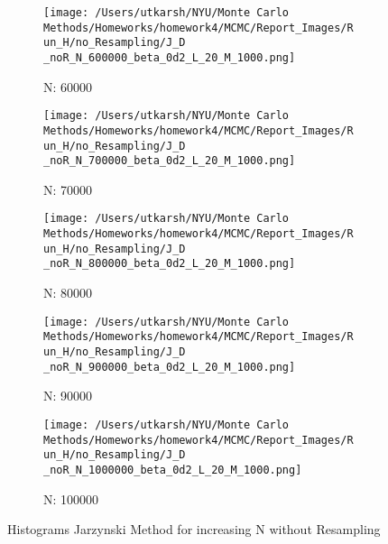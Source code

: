 \documentclass[11pt]{article}
\begin{document}
\begin{figure}[H]
	\begin{subfigure}{.18\textwidth}
		\texttt{[image: /Users/utkarsh/NYU/Monte Carlo Methods/Homeworks/homework4/MCMC/Report\_Images/Run\_H/no\_Resampling/J\_D \_noR\_N\_600000\_beta\_0d2\_L\_20\_M\_1000.png]}
		\caption{N: 60000}
	\end{subfigure}
	\begin{subfigure}{.18\textwidth}
		\texttt{[image: /Users/utkarsh/NYU/Monte Carlo Methods/Homeworks/homework4/MCMC/Report\_Images/Run\_H/no\_Resampling/J\_D \_noR\_N\_700000\_beta\_0d2\_L\_20\_M\_1000.png]}
		\caption{N: 70000}
	\end{subfigure}
	\begin{subfigure}{.18\textwidth}
		\texttt{[image: /Users/utkarsh/NYU/Monte Carlo Methods/Homeworks/homework4/MCMC/Report\_Images/Run\_H/no\_Resampling/J\_D \_noR\_N\_800000\_beta\_0d2\_L\_20\_M\_1000.png]}
		\caption{N: 80000}
	\end{subfigure}	
	\begin{subfigure}{.18\textwidth}
		\texttt{[image: /Users/utkarsh/NYU/Monte Carlo Methods/Homeworks/homework4/MCMC/Report\_Images/Run\_H/no\_Resampling/J\_D \_noR\_N\_900000\_beta\_0d2\_L\_20\_M\_1000.png]}
		\caption{N: 90000}
	\end{subfigure}	
	\begin{subfigure}{.18\textwidth}
		\texttt{[image: /Users/utkarsh/NYU/Monte Carlo Methods/Homeworks/homework4/MCMC/Report\_Images/Run\_H/no\_Resampling/J\_D \_noR\_N\_1000000\_beta\_0d2\_L\_20\_M\_1000.png]}
		\caption{N: 100000}
	\end{subfigure}	
	\caption{Histograms Jarzynski Method for increasing N without Resampling}
	\label{fig:jarzynski_hist_no_resampling}
\end{figure}
\end{document}
